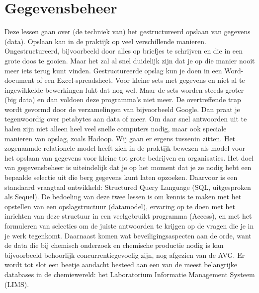 \chapter{Gegevensbeheer}
\label{chap:gegevensbeheer}
Deze lessen gaan over (de techniek van) het gestructureerd opslaan van gegevens (data). Opslaan kan in de praktijk op veel verschillende manieren. Ongestructureerd, bijvoorbeeld door alles op briefjes te schrijven en die in een grote doos te gooien. Maar het zal al snel duidelijk zijn dat je op die manier nooit meer iets terug kunt vinden. Gestructureerde opslag kun je doen in een Word-document of een Excel-spreadsheet. Voor kleine sets met gegevens en niet al te ingewikkelde bewerkingen lukt dat nog wel. Maar de sets worden steeds groter (big data) en dan voldoen deze programma’s niet meer. De overtreffende trap wordt gevormd door de verzamelingen van bijvoorbeeld Google. Dan praat je tegenwoordig over petabytes aan data of meer. Om daar snel antwoorden uit te halen zijn niet alleen heel veel snelle computers nodig, maar ook speciale manieren van opslag, zoals Hadoop.
Wij gaan er ergens tussenin zitten. Het zogenaamde relationele model heeft zich in de praktijk bewezen als model voor het opslaan van gegevens voor kleine tot grote bedrijven en organisaties. Het doel van gegevensbeheer is uiteindelijk dat je op het moment dat je ze nodig hebt een bepaalde selectie uit die berg gegevens kunt laten opzoeken. Daarvoor is een standaard vraagtaal ontwikkeld: Structured Query Language (SQL, uitgesproken als Sequel). De bedoeling van deze twee lessen is om kennis te maken met het opstellen van een opslagstructuur (datamodel), ervaring op te doen met het inrichten van deze structuur in een veelgebruikt programma (Access), en met het formuleren van selecties om de juiste antwoorden te krijgen op de vragen die je in je werk tegenkomt. Daarnaast komen wat beveiligingsaspecten aan de orde, want de data die bij chemisch onderzoek en chemische productie nodig is kan bijvoorbeeld behoorlijk concurrentiegevoelig zijn, nog afgezien van de AVG. Er wordt tot slot een beetje aandacht besteed aan een van de meest belangrijke databases in de chemiewereld: het Laboratorium Informatie Management Systeem (LIMS).

